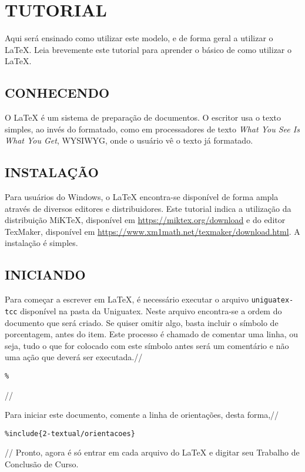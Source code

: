 \chapter{TUTORIAL}
\label{tutorial}
Aqui será ensinado como utilizar este modelo, e de forma geral a utilizar o LaTeX. Leia brevemente este tutorial para aprender o básico de como utilizar o LaTeX.
\section{CONHECENDO}
\label{conhecendo}
O LaTeX é um sistema de preparação de documentos. O escritor usa o texto simples, ao invés do formatado, como em processadores de texto \textit{What You See Is What You Get}, WYSIWYG, onde o usuário vê o texto já formatado.

\section{INSTALAÇÃO}
\label{instalacao}
Para usuários do Windows, o LaTeX encontra-se disponível de forma ampla através de diversos editores e distribuidores. Este tutorial indica a utilização da distribuição MiKTeX, disponível em \url{https://miktex.org/download} e do editor TexMaker, disponível em \url{https://www.xm1math.net/texmaker/download.html}. A instalação é simples.

\section{INICIANDO}
\label{iniciando}
Para começar a escrever em LaTeX, é necessário executar o arquivo
\verb|uniguatex-tcc| disponível na pasta da Uniguatex. Neste arquivo encontra-se a ordem do documento que será criado. Se quiser omitir algo, basta incluir o símbolo de porcentagem, antes do item. Este processo é chamado de comentar uma linha, ou seja, tudo o que for colocado com este símbolo antes será um comentário e não uma ação que deverá ser executada.//

\begin{verbatim}
%
\end{verbatim}//

Para iniciar este documento, comente a linha de orientações, desta forma,//
\begin{verbatim}
%include{2-textual/orientacoes}
\end{verbatim}//
Pronto, agora é só entrar em cada arquivo do LaTeX e digitar seu Trabalho de Conclusão de Curso.

